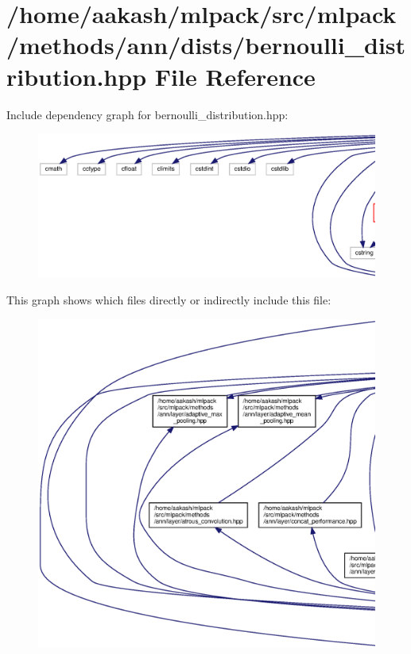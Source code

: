 \section{/home/aakash/mlpack/src/mlpack/methods/ann/dists/bernoulli\+\_\+distribution.hpp File Reference}
\label{bernoulli__distribution_8hpp}
Include dependency graph for bernoulli\+\_\+distribution.\+hpp\+:
\nopagebreak
\begin{figure}[H]
\begin{center}
\leavevmode
\includegraphics[width=350pt]{bernoulli__distribution_8hpp__incl}
\end{center}
\end{figure}
This graph shows which files directly or indirectly include this file\+:
\nopagebreak
\begin{figure}[H]
\begin{center}
\leavevmode
\includegraphics[width=350pt]{bernoulli__distribution_8hpp__dep__incl}
\end{center}
\end{figure}
